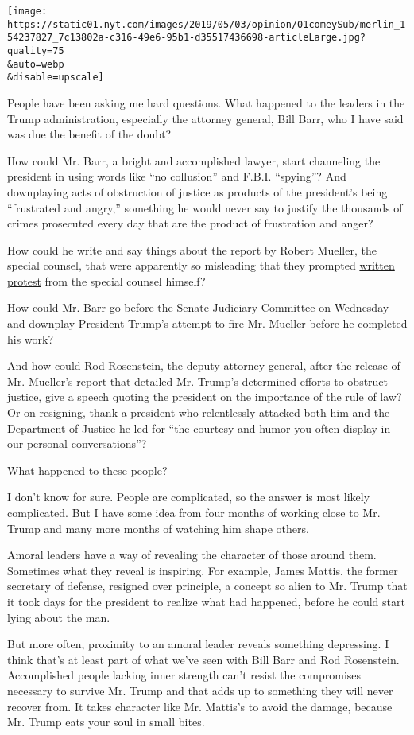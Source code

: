 \texttt{[image: https://static01.nyt.com/images/2019/05/03/opinion/01comeySub/merlin\_154237827\_7c13802a-c316-49e6-95b1-d35517436698-articleLarge.jpg?quality=75\\\&auto=webp\\\&disable=upscale]}

People have been asking me hard questions. What happened to the leaders
in the Trump administration, especially the attorney general, Bill Barr,
who I have said was due the benefit of the doubt?

How could Mr. Barr, a bright and accomplished lawyer, start channeling
the president in using words like ``no collusion'' and F.B.I.
``spying''? And downplaying acts of obstruction of justice as products
of the president's being ``frustrated and angry,'' something he would
never say to justify the thousands of crimes prosecuted every day that
are the product of frustration and anger?

How could he write and say things about the report by Robert Mueller,
the special counsel, that were apparently so misleading that they
prompted
\href{https://www.nytimes.com/2019/04/30/us/politics/mueller-barr.html}{written
protest} from the special counsel himself?

How could Mr. Barr go before the Senate Judiciary Committee on Wednesday
and downplay President Trump's attempt to fire Mr. Mueller before he
completed his work?

And how could Rod Rosenstein, the deputy attorney general, after the
release of Mr. Mueller's report that detailed Mr. Trump's determined
efforts to obstruct justice, give a speech quoting the president on the
importance of the rule of law? Or on resigning, thank a president who
relentlessly attacked both him and the Department of Justice he led for
``the courtesy and humor you often display in our personal
conversations''?

What happened to these people?

I don't know for sure. People are complicated, so the answer is most
likely complicated. But I have some idea from four months of working
close to Mr. Trump and many more months of watching him shape others.

Amoral leaders have a way of revealing the character of those around
them. Sometimes what they reveal is inspiring. For example, James
Mattis, the former secretary of defense, resigned over principle, a
concept so alien to Mr. Trump that it took days for the president to
realize what had happened, before he could start lying about the man.

But more often, proximity to an amoral leader reveals something
depressing. I think that's at least part of what we've seen with Bill
Barr and Rod Rosenstein. Accomplished people lacking inner strength
can't resist the compromises necessary to survive Mr. Trump and that
adds up to something they will never recover from. It takes character
like Mr. Mattis's to avoid the damage, because Mr. Trump eats your soul
in small bites.

